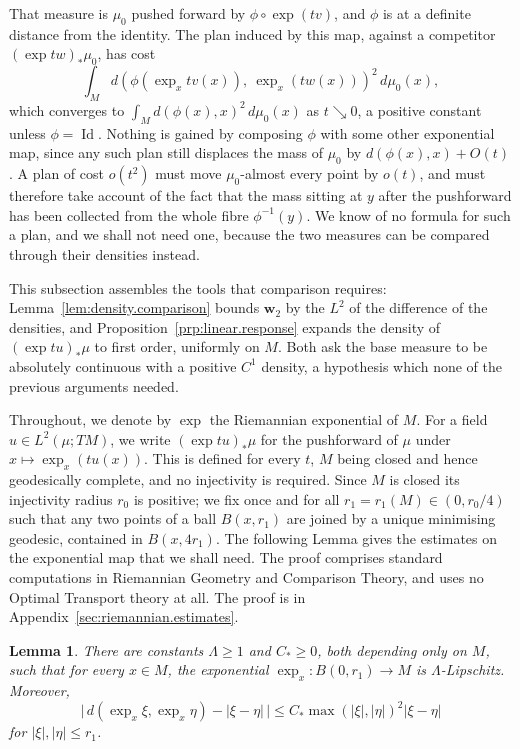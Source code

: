 \documentclass[11pt,reqno]{amsart}
\theoremstyle{plain}
\newtheorem{lem}[thm]{Lemma}
\theoremstyle{definition}
\newcommand{\dw}{\mathbf{w}_2}
\DeclareMathOperator{\Id}{Id}
\begin{document}
That measure is \( \mu_0 \) pushed forward by \( \phi\circ\exp(tv) \), and \( \phi \) is at a definite distance from the identity.
The plan induced by this map, against a competitor \( (\exp tw)_\ast\mu_0 \), has cost
\[
    \int_Md\left(\phi(\exp_x tv(x)),\ \exp_x(tw(x))\right)^2\,d\mu_0(x),
\]
which converges to \( \int_Md(\phi(x),x)^2\,d\mu_0(x) \) as \( t\searrow0 \), a positive constant unless \( \phi=\Id \).
Nothing is gained by composing \( \phi \) with some other exponential map, since any such plan still displaces the mass of \( \mu_0 \) by \( d(\phi(x),x)+O(t) \).
A plan of cost \( o(t^2) \) must move \( \mu_0 \)-almost every point by \( o(t) \), and must therefore take account of the fact that the mass sitting at \( y \) after the pushforward has been collected from the whole fibre \( \phi^{-1}(y) \).
We know of no formula for such a plan, and we shall not need one, because the two measures can be compared through their densities instead.

This subsection assembles the tools that comparison requires:
Lemma~\ref{lem:density.comparison} bounds \( \dw \) by the \(L^2\) of the difference of the densities, and Proposition~\ref{prp:linear.response} expands the density of \( (\exp tu)_\ast\mu \) to first order, uniformly on \( M \).
Both ask the base measure to be absolutely continuous with a positive \( C^1 \) density, a hypothesis which none of the previous arguments needed.

Throughout, we denote by \( \exp \) the Riemannian exponential of \( M \).
For a field \( u\in L^2(\mu;TM) \), we write \( (\exp tu)_\ast\mu \) for the pushforward of \( \mu \) under \( x\mapsto\exp_x(tu(x)) \). 
This is defined for every \( t \), \( M \) being closed and hence geodesically complete, and no injectivity is required.
Since \( M \) is closed its injectivity radius \( r_0 \) is positive; we fix once and for all \( r_1=r_1(M)\in(0,r_0/4) \) such that any two points of a ball \( B(x,r_1) \) are joined by a unique minimising geodesic, contained in \( B(x,4r_1) \).
The following Lemma gives the estimates on the exponential map that we shall need.
The proof comprises standard computations in Riemannian Geometry and Comparison Theory, and uses no Optimal Transport theory at all.
The proof is in Appendix~\ref{sec:riemannian.estimates}.

\begin{lem}
\label{lem:exp.estimates}
    There are constants \( \Lambda\ge1 \) and \( C_\ast\ge0 \), both depending only on \( M \), such that for every \( x\in M \), the exponential \(\exp_x: B(0, r_1) \to M\) is \(\Lambda\)-Lipschitz.
    Moreover, 
    \[
        \big\lvert\,d(\exp_x\xi,\exp_x\eta)-\lvert\xi-\eta\rvert\,\big\rvert \le C_\ast\max(\lvert\xi\rvert,\lvert\eta\rvert)^2\lvert\xi-\eta\rvert 
    \] 
    for \(\lvert \xi \rvert, \lvert \eta\rvert \le r_1\). 
\end{lem}
\end{document}
